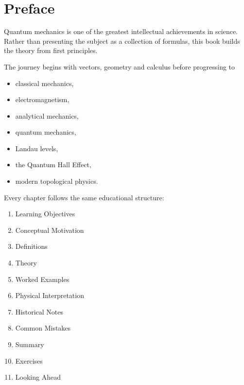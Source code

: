 \chapter*{Preface}

Quantum mechanics is one of the greatest intellectual achievements in science.
Rather than presenting the subject as a collection of formulas, this book
builds the theory from first principles.

The journey begins with vectors, geometry and calculus before progressing to

\begin{itemize}
	\item classical mechanics,
	\item electromagnetism,
	\item analytical mechanics,
	\item quantum mechanics,
	\item Landau levels,
	\item the Quantum Hall Effect,
	\item modern topological physics.
\end{itemize}

Every chapter follows the same educational structure:

\begin{enumerate}
	\item Learning Objectives
	\item Conceptual Motivation
	\item Definitions
	\item Theory
	\item Worked Examples
	\item Physical Interpretation
	\item Historical Notes
	\item Common Mistakes
	\item Summary
	\item Exercises
	\item Looking Ahead
\end{enumerate}

